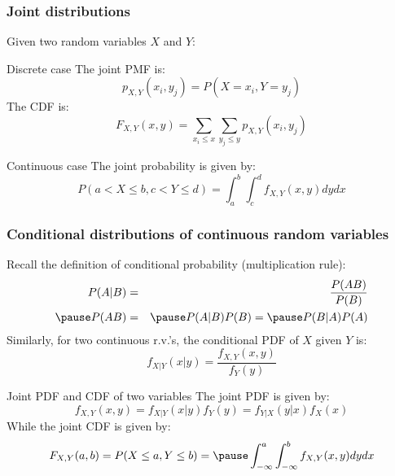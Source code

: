 \documentclass[usenames,dvipsnames,smaller]{beamer}
\newcommand{\?}{\stackrel{?}{=}}
\newcommand{\fr}{\frac}
\begin{document}
\begin{frame}
  \frametitle{Joint distributions}\pause
  Given two random variables $X$ and $Y$:

  \begin{block}{Discrete case}
    The joint PMF is:
    \begin{equation}
      \label{eq:62}
      p_{X,Y}(x_i,y_j) = P(X=x_i, Y = y_j)
    \end{equation} \pause
    The CDF is:
    \begin{equation}
      \label{eq:63}
      F_{X,Y}(x,y) = \sum_{x_i \le x}\sum_{y_j \le y} p_{X,Y}(x_i, y_j)
    \end{equation}
  \end{block}
  \pause

  \begin{block}{Continuous case}\pause
    The joint probability is given by:
    \begin{equation}
      P(a < X \le b, c < Y \le d) = \int_a^b \int_c^d f_{X,Y}(x,y)dy dx
    \end{equation}
  \end{block}
\end{frame}




\begin{frame}
  \frametitle{Conditional distributions of continuous random variables}
  Recall the definition of conditional probability (multiplication rule):\pause
  \begin{eqnarray}
    P(A|B) &=& \fr{P(AB)}{P(B)} \\\pause
    P(AB) &=& \pause P(A|B)P(B)  = \pause P(B|A)P(A)
  \end{eqnarray}
  \pause
  Similarly, for two continuous r.v.'s, the conditional PDF of $X$ given $Y$ is:
  \begin{equation}
    \label{eq:10}
    f_{X|Y}(x|y) = \fr{f_{X,Y}(x,y)}{f_Y(y)}
  \end{equation}
  \pause
  \begin{block}{Joint PDF and CDF of two variables}\pause
  The joint PDF is given by:
  \begin{equation}
    \label{eq:11}
    f_{X,Y}(x,y) = f_{X|Y}(x|y)f_Y(y) = f_{Y|X}(y|x)f_X(x)
  \end{equation}
  \pause
  While the joint CDF is given by:
   \begin{equation}
    \label{eq:13}
    F_{X,Y}(a,b) = P(X\le a,Y\le b) =\pause \int_{-\infty}^a \int_{-\infty}^b f_{X,Y}(x,y)dydx
  \end{equation}
\end{block}
\end{frame}
\end{document}
